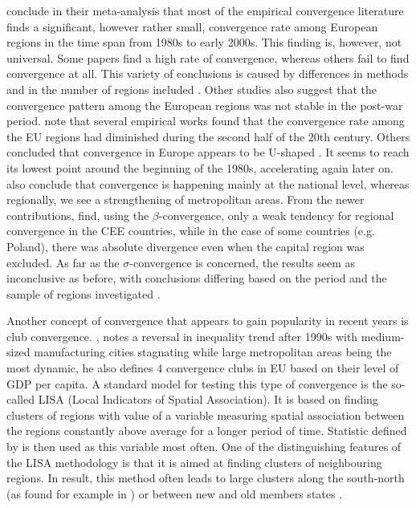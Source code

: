 \documentclass[11pt]{article}
\begin{document}
\citet{eckey2007convergence} conclude in their meta-analysis that most of the empirical convergence literature finds a significant, however rather small, convergence rate among European regions in the time span from 1980s to early 2000s. This finding is, however, not universal. Some papers find a high rate of convergence, whereas others fail to find convergence at all. This variety of conclusions is caused by differences in methods and in the number of regions included \citep{eckey2007convergence}. Other studies also suggest that the convergence pattern among the European regions was not stable in the post-war period. \citet{eckey2007convergence} note that several empirical works found that the convergence rate among the EU regions had diminished during the second half of the 20th century. Others concluded that convergence in Europe appears to be U-shaped \citep{basile2001regional, geppert2008regional}. It seems to reach its lowest point around the beginning of the 1980s, accelerating again later on. \citet{geppert2008regional} also conclude that convergence is happening mainly at the national level, whereas regionally, we see a strengthening of metropolitan areas. From the newer contributions, \citet*{sme2012regional} find, using the $\beta$-convergence, only a weak tendency for regional convergence in the CEE countries, while in the case of some countries (e.g. Poland), there was absolute divergence even when the capital region was excluded. As far as the $\sigma$-convergence is concerned, the results seem as inconclusive as before, with conclusions differing based on the period and the sample of regions investigated \citep{eckey2007convergence}.
 
 Another concept of convergence that appears to gain popularity in recent years is club convergence. \citet{iammarino2017regional}, notes a reversal in inequality trend after 1990s with medium-sized manufacturing cities stagnating while large metropolitan areas being the most dynamic, he also defines 4 convergence clubs in EU based on their level of GDP per capita.  %
 A standard model for testing this type of convergence is the so-called LISA (Local Indicators of Spatial Association). It is based on finding clusters of regions with value of a variable measuring spatial association between the regions constantly above  average for a longer period of time. Statistic defined by \citet{getis1992analysis} is then used as this variable most often. One of the distinguishing features of the LISA methodology is that it is aimed at finding clusters of neighbouring regions. In result, this method often leads to large clusters along the south-north  (as found for example in \citet{baumont2003spatial}) or between new and old members states \citep{eckey2007convergence}.
 
\end{document}

